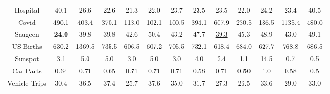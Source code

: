 \begin{table}
\begin{tabular}{c|c|cccccc|ccccc}
    Hospital &40.1& 26.6&	22.6&	21.3&	22.0	&23.7&	23.5&	23.5&	22.0&	24.2&	23.4&	40.5\\
    
    Covid &490.1& 403.4&	370.1&	113.0&	102.1&	100.5&	394.1&	607.9&	230.5&	186.5&	1135.4&	480.0\\
    
    Saugeen & \textbf{24.0} & 39.8	&39.8	&42.6&	50.4&	43.2&	47.7&	\underline{39.3} &	45.3&	48.9&	43.0&	49.1\\
    
    US Births &630.2& 1369.5&	735.5&	606.5&	607.2&	705.5&	732.1&	618.4&	684.0&	627.7&	768.8&	686.5\\
    
    Sunspot &3.1& 5.0	&5.0&	3.0	&5.0&	3.0	&4.0&	2.4	&1.1&	14.5&	0.7	&0.5\\
    
    Car Parts & 0.64 & 0.71&	0.65	&0.71&	0.71&	0.71&	\underline{0.58}&	0.71&	\textbf{0.50}&	1.0&	\underline{0.58}&	0.5\\
    
    Vehicle Trips &30.4& 36.5&	37.4&	25.7&	37.6&	35.0&	31.7&	27.3&	26.5&	33.6&	29.0&	33.0\\
    \bottomrule
    \end{tabular}
\end{table}
